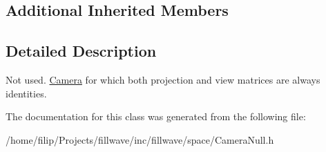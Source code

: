 \subsection*{Additional Inherited Members}


\subsection{Detailed Description}
Not used. \hyperlink{classfillwave_1_1space_1_1Camera}{Camera} for which both projection and view matrices are always identities. 

The documentation for this class was generated from the following file\+:\begin{DoxyCompactItemize}
\item 
/home/filip/\+Projects/fillwave/inc/fillwave/space/Camera\+Null.\+h\end{DoxyCompactItemize}
